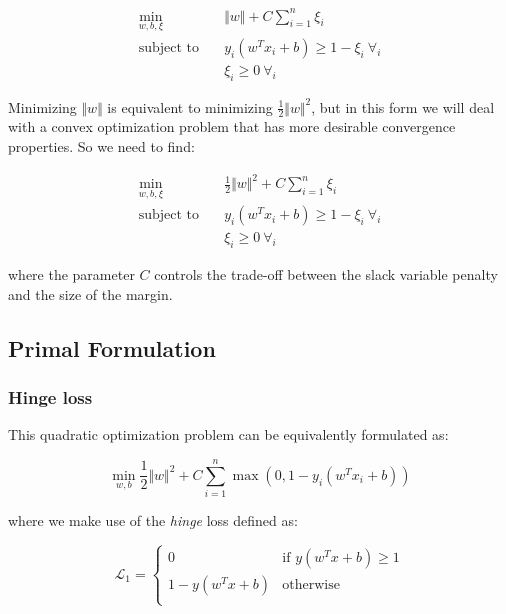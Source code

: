 \begin{equation}
    \begin{aligned}
        \min_{w,b,\xi} \quad & \Vert w \Vert + C \sum_{i=1}^{n} \xi_i \\
            \textrm{subject to} \quad & y_i (w^T x_i + b) \geq 1 - \xi_i \ \forall_i \\ & \xi_i \geq 0 \ \forall_i
    \end{aligned} \tag{1.4}
\end{equation}

Minimizing $\Vert w\Vert$ is equivalent to minimizing $\displaystyle \frac{1}{2}\Vert w\Vert^{2}$, but in this form we will deal with a convex optimization problem that has more desirable convergence properties. So we need to find:

\begin{equation}
    \begin{aligned}
        \min_{w,b,\xi} \quad & \frac{1}{2} \Vert w \Vert^2 + C \sum_{i=1}^{n} \xi_i \\
            \textrm{subject to} \quad & y_i (w^T x_i + b) \geq 1 - \xi_i \ \forall_i \\ & \xi_i \geq 0 \ \forall_i
    \end{aligned} \tag{1.5}
\end{equation}

where the parameter $C$ controls the trade-off between the slack variable penalty and the size of the margin.

\subsection{Primal Formulation}

\subsubsection{Hinge loss}

This quadratic optimization problem can be equivalently formulated as: 

\begin{equation}
    \min_{w,b} \frac{1}{2} \Vert w \Vert^2 + C \sum_{i=1}^n \max(0, 1 - y_i (w^T x_i + b)) \tag{1.6}
\end{equation}

where we make use of the \emph{hinge} loss defined as:

\begin{equation}
	\mathcal{L}_1 = 
	\begin{cases}
		0 & \text{if } y (w^T x + b) \geq 1 \\
		1 - y (w^T x + b) & \text{otherwise} \\
	\end{cases} \tag{1.7a}
\end{equation}

